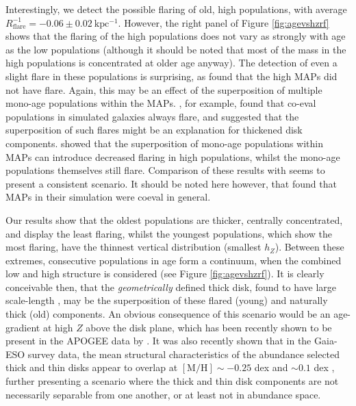 Interestingly, we detect the possible flaring of old, high \afe{} populations, with average $R_{\mathrm{flare}}^{-1} = -0.06 \pm 0.02\ \mathrm{kpc^{-1}}$. However, the right panel of Figure \ref{fig:agevshzrf} shows that the flaring of the high \afe{} populations does not vary as strongly with age as the low \afe{} populations (although it should be noted that most of the mass in the high \afe{} populations is concentrated at older age anyway). The detection of even a slight flare in these populations is surprising, as \citet{2016ApJ...823...30B} found that the high \afe{} MAPs did not have flare. Again, this may be an effect of the superposition of multiple mono-age populations within the MAPs. \citet{2015ApJ...804L...9M}, for example, found that co-eval populations in simulated galaxies always flare, and suggested that the superposition of such flares might be an explanation for thickened disk components. \citet{2017ApJ...834...27M} showed that the superposition of mono-age populations within MAPs can introduce decreased flaring in high \afe{} populations, whilst the mono-age populations themselves still flare. Comparison of these results with \citet{2016ApJ...823...30B} seems to present a consistent scenario. It should be noted here however, that \citet{2013MNRAS.436..625S} found that MAPs in their simulation were coeval in general.

Our results show that the oldest populations are thicker, centrally concentrated, and display the least flaring, whilst the youngest populations, which show the most flaring, have the thinnest vertical distribution (smallest $h_Z$). Between these extremes, consecutive populations in age form a continuum, when the combined low and high \afe{} structure is considered (see Figure \ref{fig:agevshzrf}). It is clearly conceivable then, that the \emph{geometrically} defined thick disk, found to have large scale-length \citep[e.g.,][]{2013MNRAS.431..930J,2008ApJ...673..864J}, may be the superposition of these flared (young) and naturally thick (old) components. An obvious consequence of this scenario would be an age-gradient at high $Z$ above the disk plane, which has been recently shown to be present in the APOGEE data by \citet{2016arXiv160901168M}. It was also recently shown that in the Gaia-ESO survey data, the mean structural characteristics of the abundance selected thick and thin disks appear to overlap at $\mathrm{[M/H]}\sim-0.25$ dex and \afe{} $\sim 0.1$ dex \citep{2014A&A...567A...5R}, further presenting a scenario where the thick and thin disk components are not necessarily separable from one another, or at least not in abundance space. 

